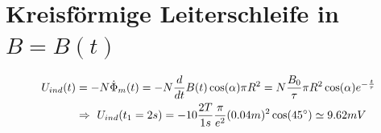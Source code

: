 \documentclass[a4paper,12pt]{article}
\begin{document}
\section{Kreisförmige Leiterschleife in $B=B(t)$}
\begin{align*}
U_{ind}(t)&=-N\dot{\Phi}_m(t)=-N\frac{d}{dt}B(t)\cos(\alpha)\pi R^2=N\frac{B_0}{\tau}\pi R^2\cos(\alpha)e^{-\frac{t}{\tau}}\\
&\Rightarrow\ U_{ind}(t_1=2s) = -10\frac{2T}{1s}\frac{\pi}{e^2} (0.04m)^2\cos(45\degree) \simeq 9.62mV
\end{align*}
\end{document}
